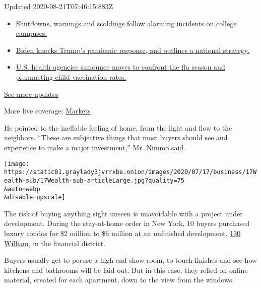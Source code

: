 Updated 2020-08-21T07:46:15.883Z

\begin{itemize}
\tightlist
\item
  \href{https://www.nytimes3xbfgragh.onion/2020/08/20/world/coronavirus-covid.html?action=click\&pgtype=Article\&state=default\&region=MAIN_CONTENT_1\&context=storylines_live_updates\#link-68774d88}{Shutdowns,
  warnings and scoldings follow alarming incidents on college campuses.}
\item
  \href{https://www.nytimes3xbfgragh.onion/2020/08/20/world/coronavirus-covid.html?action=click\&pgtype=Article\&state=default\&region=MAIN_CONTENT_1\&context=storylines_live_updates\#link-26b58724}{Biden
  knocks Trump's pandemic response, and outlines a national strategy.}
\item
  \href{https://www.nytimes3xbfgragh.onion/2020/08/20/world/coronavirus-covid.html?action=click\&pgtype=Article\&state=default\&region=MAIN_CONTENT_1\&context=storylines_live_updates\#link-4e542da3}{U.S.
  health agencies announce moves to confront the flu season and
  plummeting child vaccination rates.}
\end{itemize}

\href{https://www.nytimes3xbfgragh.onion/2020/08/20/world/coronavirus-covid.html?action=click\&pgtype=Article\&state=default\&region=MAIN_CONTENT_1\&context=storylines_live_updates}{See
more updates}

More live coverage:
\href{https://www.nytimes3xbfgragh.onion/live/2020/08/20/business/stock-market-today-coronavirus?action=click\&pgtype=Article\&state=default\&region=MAIN_CONTENT_1\&context=storylines_live_updates}{Markets}

He pointed to the ineffable feeling of home, from the light and flow to
the neighbors. ``These are subjective things that most buyers should see
and experience to make a major investment,'' Mr. Nimmo said.

\texttt{[image: https://static01.graylady3jvrrxbe.onion/images/2020/07/17/business/17Wealth-sub/17Wealth-sub-articleLarge.jpg?quality=75\\\&auto=webp\\\&disable=upscale]}

The risk of buying anything sight unseen is unavoidable with a project
under development. During the stay-at-home order in New York, 10 buyers
purchased luxury condos for \$2 million to \$6 million at an unfinished
development, \href{https://130william.com/}{130 William}, in the
financial district.

Buyers usually get to peruse a high-end show room, to touch finishes and
see how kitchens and bathrooms will be laid out. But in this case, they
relied on online material, created for each apartment, down to the view
from the windows.

